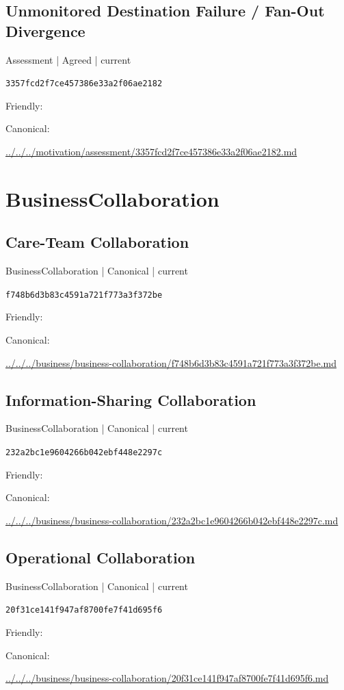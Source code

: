 \documentclass[10pt,a4paper]{article}
\begin{document}
\subsection*{Unmonitored Destination Failure / Fan-Out Divergence}
{\small Assessment | Agreed | current}\par
\texttt{3357fcd2f7ce457386e33a2f06ae2182}\par
Friendly: \par
Canonical: \par
{\footnotesize\url{../../../motivation/assessment/3357fcd2f7ce457386e33a2f06ae2182.md}}\par
\section*{BusinessCollaboration}
\subsection*{Care-Team Collaboration}
{\small BusinessCollaboration | Canonical | current}\par
\texttt{f748b6d3b83c4591a721f773a3f372be}\par
Friendly: \par
Canonical: \par
{\footnotesize\url{../../../business/business-collaboration/f748b6d3b83c4591a721f773a3f372be.md}}\par
\subsection*{Information-Sharing Collaboration}
{\small BusinessCollaboration | Canonical | current}\par
\texttt{232a2bc1e9604266b042ebf448e2297c}\par
Friendly: \par
Canonical: \par
{\footnotesize\url{../../../business/business-collaboration/232a2bc1e9604266b042ebf448e2297c.md}}\par
\subsection*{Operational Collaboration}
{\small BusinessCollaboration | Canonical | current}\par
\texttt{20f31ce141f947af8700fe7f41d695f6}\par
Friendly: \par
Canonical: \par
{\footnotesize\url{../../../business/business-collaboration/20f31ce141f947af8700fe7f41d695f6.md}}\par
\end{document}
